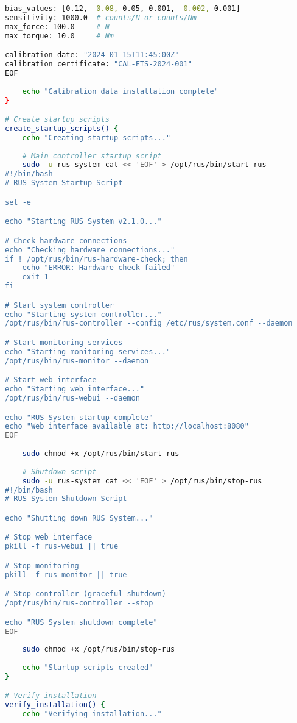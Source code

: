 \begin{lstlisting}[language=bash, caption={RUS Software Installation Script}, label={lst:app-software-install}]
bias_values: [0.12, -0.08, 0.05, 0.001, -0.002, 0.001]
sensitivity: 1000.0  # counts/N or counts/Nm
max_force: 100.0     # N
max_torque: 10.0     # Nm

calibration_date: "2024-01-15T11:45:00Z"
calibration_certificate: "CAL-FTS-2024-001"
EOF
    
    echo "Calibration data installation complete"
}

# Create startup scripts
create_startup_scripts() {
    echo "Creating startup scripts..."
    
    # Main controller startup script
    sudo -u rus-system cat << 'EOF' > /opt/rus/bin/start-rus
#!/bin/bash
# RUS System Startup Script

set -e

echo "Starting RUS System v2.1.0..."

# Check hardware connections
echo "Checking hardware connections..."
if ! /opt/rus/bin/rus-hardware-check; then
    echo "ERROR: Hardware check failed"
    exit 1
fi

# Start system controller
echo "Starting system controller..."
/opt/rus/bin/rus-controller --config /etc/rus/system.conf --daemon

# Start monitoring services
echo "Starting monitoring services..."
/opt/rus/bin/rus-monitor --daemon

# Start web interface
echo "Starting web interface..."
/opt/rus/bin/rus-webui --daemon

echo "RUS System startup complete"
echo "Web interface available at: http://localhost:8080"
EOF
    
    sudo chmod +x /opt/rus/bin/start-rus
    
    # Shutdown script
    sudo -u rus-system cat << 'EOF' > /opt/rus/bin/stop-rus
#!/bin/bash
# RUS System Shutdown Script

echo "Shutting down RUS System..."

# Stop web interface
pkill -f rus-webui || true

# Stop monitoring
pkill -f rus-monitor || true

# Stop controller (graceful shutdown)
/opt/rus/bin/rus-controller --stop

echo "RUS System shutdown complete"
EOF
    
    sudo chmod +x /opt/rus/bin/stop-rus
    
    echo "Startup scripts created"
}

# Verify installation
verify_installation() {
    echo "Verifying installation..."
    

\end{lstlisting}
